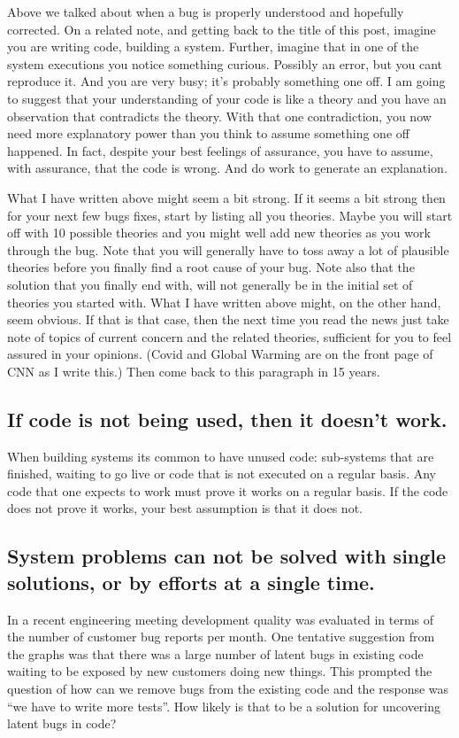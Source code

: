 Above we talked about when a bug is properly understood and hopefully corrected. On a related note, and getting back to the title of this post, imagine you are writing
code, building a system. Further, imagine that in one of the system executions you notice something curious. Possibly an error, but you cant reproduce it. And you are very busy;
it's probably something one off. I am going to suggest that your understanding of your code is like a theory and you have an observation that contradicts the
theory. With that one contradiction, you now need more explanatory power than you think to assume something one off happened. In fact, despite your
best feelings of assurance, you have to assume, with assurance, that the code is wrong. And do work to generate an explanation.

What I have written above might seem a bit strong. If it seems a bit strong then for your next few bugs fixes, start by listing all you theories. Maybe
you will start off with 10 possible theories and you might well add new theories as you work through the bug. Note that you will generally have to toss
away a lot of plausible theories before you finally find a root cause of your bug. Note also that the solution that you finally end with, will not generally be
in the initial set of theories you started with. What I have written above might, on the other hand, seem obvious. If that is that case, then the next time
you read the news just take note of topics of current concern and the related theories, sufficient for you to feel assured in your opinions. (Covid and Global
Warming are on the front page of CNN as I write this.) Then come back to this paragraph in 15 years.

\subsection{If code is not being used, then it doesn't work.}
When building systems its common to have unused code: sub-systems that are finished, waiting to go live or code that is not
executed on a regular basis. Any code that one expects to work must prove it works on a regular basis. If the code does not prove it works, your best assumption
is that it does not.

\subsection{System problems can not be solved with single solutions, or by efforts at a single time.}
In a recent engineering meeting development quality was evaluated in terms of the number of customer bug reports per month.
One tentative suggestion from the graphs was that there was a large number of latent bugs in existing code waiting to be exposed by
new customers doing new things. This prompted the question of how can we remove bugs from the existing code and the response was
``we have to write more tests''. How likely is that to be a solution for uncovering latent bugs in code?

